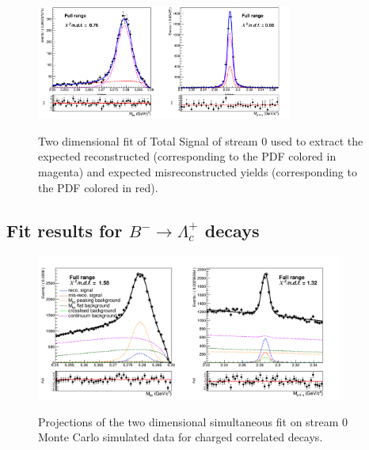  \begin{figure}[H]
    {\includegraphics[width=0.75\textwidth]{04-SimultaneousFit/figs/stream0_TotalSignal_charged_corrLambdaC_2Dfit.png}}
    \caption{Two dimensional fit of Total Signal of stream 0 used to extract the expected reconstructed (corresponding to the PDF colored in magenta) and expected misreconstructed yields (corresponding to the PDF colored in red).}
    \label{fig:stream0_TotalSignal_charged_corrLambdaC_2Dfit}
    \end{figure}


\newpage

\subsection{Fit results for $B^- \rightarrow \Lambda_c^+$ decays}  

\begin{figure}[H]
\centering
{\includegraphics[width=0.90\textwidth]{04-SimultaneousFit/figs/charged_corrSample_simultaneous2DFit_stream0.png}}
\caption{Projections of the two dimensional simultaneous fit on stream 0 Monte Carlo simulated data for charged correlated decays.}
\label{fig:charged_corrSample_simultaneous2DFit_stream0}
\end{figure}

